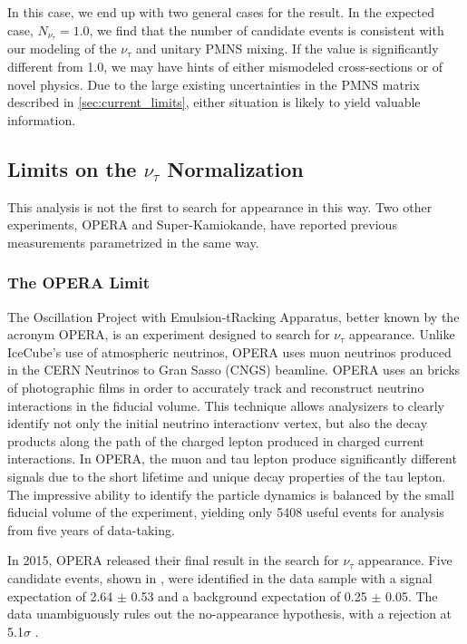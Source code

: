 In this case, we end up with two general cases for the result.
In the expected case, $N_{\nu_\tau}=1.0$, we find that the number of candidate events is consistent with our modeling of the $\nu_\tau$ and unitary PMNS mixing.
If the value is significantly different from 1.0, we may have hints of either mismodeled cross-sections or of novel physics. 
Due to the large existing uncertainties in the PMNS matrix described in \ref{sec:current_limits}, either situation is likely to yield valuable information.


\label{subsec:superk_and_opera}
\subsection{Limits on the $\nu_\tau$ Normalization}
This analysis is not the first to search for appearance in this way.
Two other experiments, OPERA and Super-Kamiokande, have reported previous measurements parametrized in the same way.

\label{subsubsec:opera_limit}
\subsubsection{The OPERA Limit}
The Oscillation Project with Emulsion-tRacking Apparatus, better known by the acronym OPERA, is an experiment designed to search for  $\nu_\tau$ appearance.
Unlike IceCube's use of atmospheric neutrinos, OPERA uses muon neutrinos produced in the CERN Neutrinos to Gran Sasso (CNGS) beamline.
OPERA uses an bricks of photographic films in order to accurately track and reconstruct neutrino interactions in the fiducial volume.
This technique allows analysizers to clearly identify not only the initial neutrino interactionv vertex, but also the decay products along the path of the charged lepton produced in charged current interactions.
In OPERA, the muon and tau lepton produce significantly different signals due to the short lifetime and unique decay properties of the tau lepton.
The impressive ability to identify the particle dynamics is balanced by the small fiducial volume of the experiment, yielding only 5408 useful events for analysis from five years of data-taking.

In 2015, OPERA released their final result in the search for $\nu_\tau$ appearance.
Five candidate events, shown in ,  were identified in the data sample with a signal expectation of 2.64 $\pm$ 0.53 and a background expectation of 0.25 $\pm$ 0.05.
The data unambiguously rules out the no-appearance hypothesis, with a rejection at 5.1$\sigma$ .

